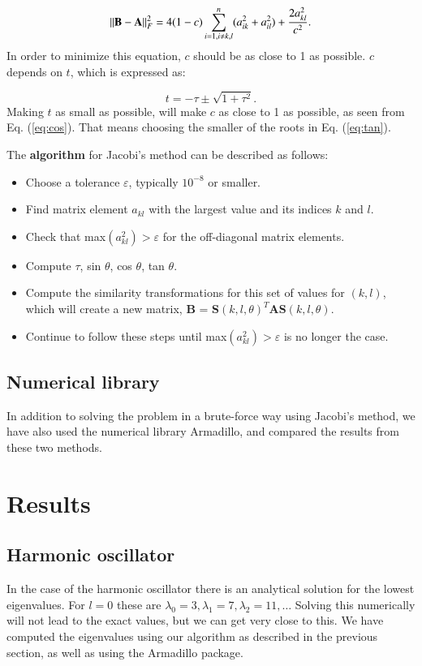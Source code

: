 \documentclass{article}
\begin{document}
\begin{multicols}{2}
\begin{equation*}
	||{\bf B}-{\bf A}||_F^2=4(1-c)\sum_{i=1,i\ne k,l}^n(a_{ik}^2+a_{il}^2) +\frac{2a_{kl}^2}{c^2}.
\end{equation*}
In order to minimize this equation, $c$ should be as close to 1 as possible. $c$ depends on $t$, which is expressed as: 

\begin{equation}\label{eq:tan}
	t = -\tau \pm \sqrt{1+\tau^2}.
\end{equation}
Making $t$ as small as possible, will make $c$ as close to 1 as possible, as seen from Eq. (\ref{eq:cos}). That means choosing the smaller of the roots in Eq. (\ref{eq:tan}).

The \textbf{algorithm} for Jacobi's method can be described as follows: 

\begin{itemize}
	\item Choose a tolerance $\varepsilon$, typically $10^{-8}$ or smaller.
	\item Find matrix element $a_{kl}$ with the largest value and its indices $k$ and $l$.
	\item Check that max$(a_{kl}^2) > \varepsilon$ for the off-diagonal matrix elements.
	\item Compute $\tau$, sin $\theta$, cos $\theta$, tan $\theta$.
	\item Compute the similarity transformations for this set of values for $(k,l)$, which will create a new matrix, \textbf{B} = \textbf{S}$(k,l,\theta)^T$\textbf{A}\textbf{S}$(k,l,\theta)$.
	\item Continue to follow these steps until max$(a_{kl}^2) > \varepsilon$ is no longer the case.
\end{itemize}

\subsection{Numerical library}
In addition to solving the problem in a brute-force way using Jacobi's method, we have also used the numerical library Armadillo, and compared the results from these two methods.



\section{Results}
\subsection{Harmonic oscillator}
In the case of the harmonic oscillator there is an analytical solution for the lowest eigenvalues. For $l = 0$ these are $\lambda_0 = 3, \lambda_1 = 7, \lambda_2 = 11, \dots$ Solving this numerically will not lead to the exact values, but we can get very close to this. We have computed the eigenvalues using our algorithm as described in the previous section, as well as using the Armadillo package.


\end{multicols}
\end{document}
